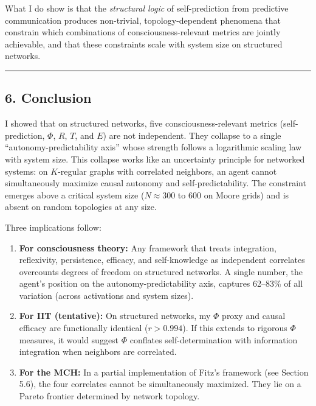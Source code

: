 \documentclass[
  11pt,
]{article}
\begin{document}
What I do show is that the \emph{structural logic} of self-prediction
from predictive communication produces non-trivial, topology-dependent
phenomena that constrain which combinations of consciousness-relevant
metrics are jointly achievable, and that these constraints scale with
system size on structured networks.

\begin{center}\rule{0.5\linewidth}{0.5pt}\end{center}

\subsection{6. Conclusion}\label{conclusion}

I showed that on structured networks, five consciousness-relevant
metrics (self-prediction, \(\Phi\), \(R\), \(T\), and \(E\)) are not
independent. They collapse to a single ``autonomy-predictability axis''
whose strength follows a logarithmic scaling law with system size. This
collapse works like an uncertainty principle for networked systems: on
\(K\)-regular graphs with correlated neighbors, an agent cannot
simultaneously maximize causal autonomy and self-predictability. The
constraint emerges above a critical system size (\(N \approx 300\) to
\(600\) on Moore grids) and is absent on random topologies at any size.

Three implications follow:

\begin{enumerate}
\def\labelenumi{\arabic{enumi}.}
\item
  \textbf{For consciousness theory:} Any framework that treats
  integration, reflexivity, persistence, efficacy, and self-knowledge as
  independent correlates overcounts degrees of freedom on structured
  networks. A single number, the agent's position on the
  autonomy-predictability axis, captures 62--83\% of all variation
  (across activations and system sizes).
\item
  \textbf{For IIT (tentative):} On structured networks, my \(\Phi\)
  proxy and causal efficacy are functionally identical (\(r > 0.994\)).
  If this extends to rigorous \(\Phi\) measures, it would suggest
  \(\Phi\) conflates self-determination with information integration
  when neighbors are correlated.
\item
  \textbf{For the MCH:} In a partial implementation of Fitz's framework
  (see Section 5.6), the four correlates cannot be simultaneously
  maximized. They lie on a Pareto frontier determined by network
  topology.
\end{enumerate}
\end{document}
